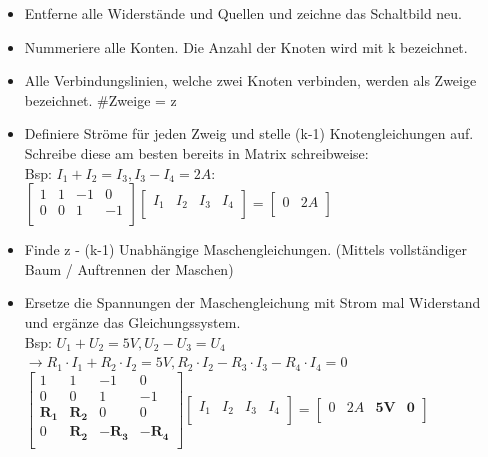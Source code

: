 					            \begin{center}
					              \begin{itemize}
					                \item Entferne alle Widerstände und Quellen und zeichne das Schaltbild neu.
					                \item Nummeriere alle Konten. Die Anzahl der Knoten wird mit k bezeichnet.
					                \item Alle Verbindungslinien, welche zwei Knoten verbinden, werden als Zweige bezeichnet. \#Zweige = z
					                \item Definiere Ströme für jeden Zweig und stelle (k-1) Knotengleichungen auf. Schreibe diese am besten bereits in Matrix schreibweise: \\
					                Bsp: $I_1 + I_2 = I_3, I_3 - I_4 = 2A $: \\
					                $
					 \left[ {\begin{array}{cccc}
					    1 & 1 & -1 & 0 \\
					    0 & 0 & 1 & -1 \\					\end{array} } \right] \left[ {\begin{array}{c} I_1 & I_2 & I_3 & I_4 \\ \end{array} } \right] =   \left[ {\begin{array}{c}  0 & 2A\\ \end{array} } \right] $ \\

					                \item Finde z - (k-1) Unabhängige Maschengleichungen. (Mittels vollständiger Baum / Auftrennen der Maschen)
					                \item Ersetze die Spannungen der Maschengleichung mit Strom mal Widerstand und ergänze das Gleichungssystem.
					                \\ Bsp:
					                $U_1 + U_2 = 5V, U_2 - U_3 = U_4$ \\ $ \rightarrow R_1 \cdot I_1 + R_2 \cdot I_2 = 5V, R_2 \cdot I_2 - R_3 \cdot I_3 - R_4 \cdot I_4 = 0$ \\
					                $
					 \left[ {\begin{array}{cccc}
					    1 & 1 & -1 & 0 \\
					    0 & 0 & 1 & -1 \\
					    \mathbf{R_1} & \mathbf{R_2} & 0 & 0 \\
					    0 & \mathbf{R_2} & \mathbf{-R_3} & \mathbf{-R_4} \\
					\end{array} } \right] \left[ {\begin{array}{c} I_1 & I_2 & I_3 & I_4 \\ \end{array} } \right] =   \left[ {\begin{array}{c}  0 & 2A & \mathbf{5V} & \mathbf{0} \\ \end{array} } \right] $ \\


\end{itemize}
\end{center}
